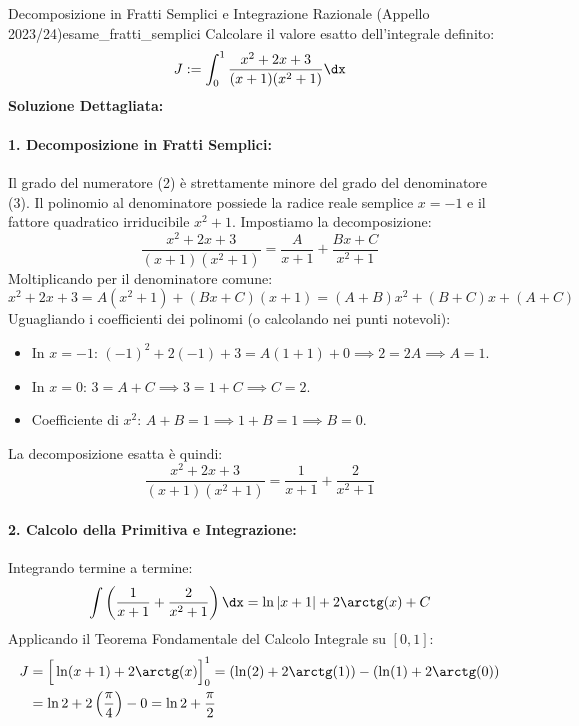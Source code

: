 \begin{esempio}{Decomposizione in Fratti Semplici e Integrazione Razionale (Appello 2023/24)}{esame_fratti_semplici}
Calcolare il valore esatto dell'integrale definito:
\[
    J := \int_0^1 \frac{x^2 + 2x + 3}{(x+1)(x^2 + 1)} \dx
\]
\tcblower
\textbf{Soluzione Dettagliata:}

\paragraph{1. Decomposizione in Fratti Semplici:}
Il grado del numeratore (2) è strettamente minore del grado del denominatore (3).
Il polinomio al denominatore possiede la radice reale semplice $x = -1$ e il fattore quadratico irriducibile $x^2 + 1$.
Impostiamo la decomposizione:
\[
    \frac{x^2 + 2x + 3}{(x+1)(x^2 + 1)} = \frac{A}{x+1} + \frac{Bx + C}{x^2 + 1}
\]
Moltiplicando per il denominatore comune:
\[
    x^2 + 2x + 3 = A(x^2 + 1) + (Bx + C)(x + 1) = (A + B)x^2 + (B + C)x + (A + C)
\]
Uguagliando i coefficienti dei polinomi (o calcolando nei punti notevoli):
\begin{itemize}
    \item In $x = -1$: $(-1)^2 + 2(-1) + 3 = A(1 + 1) + 0 \implies 2 = 2A \implies A = 1$.
    \item In $x = 0$: $3 = A + C \implies 3 = 1 + C \implies C = 2$.
    \item Coefficiente di $x^2$: $A + B = 1 \implies 1 + B = 1 \implies B = 0$.
\end{itemize}
La decomposizione esatta è quindi:
\[
    \frac{x^2 + 2x + 3}{(x+1)(x^2 + 1)} = \frac{1}{x+1} + \frac{2}{x^2 + 1}
\]

\paragraph{2. Calcolo della Primitiva e Integrazione:}
Integrando termine a termine:
\[
    \int \left( \frac{1}{x+1} + \frac{2}{x^2+1} \right) \dx = \ln|x+1| + 2\arctg(x) + C
\]
Applicando il Teorema Fondamentale del Calcolo Integrale su $[0, 1]$:
\begin{align*}
    J &= \Big[ \ln(x+1) + 2\arctg(x) \Big]_0^1 = \left(\ln(2) + 2\arctg(1)\right) - \left(\ln(1) + 2\arctg(0)\right) \\
    &= \ln 2 + 2\left(\frac{\pi}{4}\right) - 0 = \ln 2 + \frac{\pi}{2}
\end{align*}
\end{esempio}
